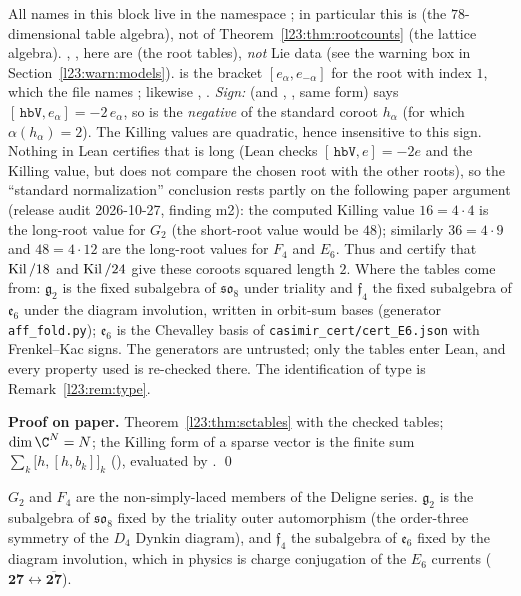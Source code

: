 \begin{dictionary}
All names in this block live in the namespace ; in particular this  is
 (the $78$-dimensional table algebra), not  of Theorem~\ref{l23:thm:rootcounts}
(the lattice algebra). , ,  here are  (the root tables), \emph{not} Lie data (see the
warning box in Section~\ref{l23:warn:models}).  is the bracket $[e_\alpha,e_{-\alpha}]$ for the root with index $1$, which
the file names ; likewise , . \emph{Sign:}  (and , ,
same form) says $[\,\mathtt{hbV},e_\alpha]=-2\,e_\alpha$, so  is the \emph{negative} of the standard coroot $h_\alpha$ (for which
$\alpha(h_\alpha)=2$). The Killing values are quadratic, hence insensitive to this sign. Nothing in Lean certifies that  is long
(Lean checks $[\,\mathtt{hbV},e]=-2e$ and the Killing value, but does not compare the chosen root with the other roots), so the
``standard normalization'' conclusion rests partly on the following paper argument (release audit 2026-10-27, finding m2): the computed Killing value $16=4\cdot4$ is the long-root value for $G_2$ (the short-root value would be $48$); similarly $36=4\cdot9$
and $48=4\cdot12$ are the long-root values for $F_4$ and $E_6$. Thus  and  certify that
$\operatorname{Kil}/18$ and $\operatorname{Kil}/24$ give these coroots squared length $2$. Where the
tables come from: $\mathfrak g_2$ is the fixed subalgebra of $\mathfrak{so}_8$ under triality and $\mathfrak f_4$ the fixed subalgebra of $\mathfrak e_6$
under the diagram involution, written in orbit-sum bases (generator \texttt{aff\_fold.py}); $\mathfrak e_6$ is the Chevalley basis of
\texttt{casimir\_cert/cert\_E6.json} with Frenkel--Kac signs. The generators are untrusted; only the tables enter Lean, and every property used
is re-checked there. The identification of type is Remark~\ref{l23:rem:type}.
\end{dictionary}

\textbf{Proof on paper.} Theorem~\ref{l23:thm:sctables} with the checked tables; $\dim\C^N=N$; the Killing form of a sparse vector is the
finite sum $\sum_k\big[h,[h,b_k]\big]_k$ (), evaluated by . \qed

\begin{physics}
$G_2$ and $F_4$ are the non-simply-laced members of the Deligne series. $\mathfrak g_2$ is the subalgebra of $\mathfrak{so}_8$ fixed by
the triality outer automorphism (the order-three symmetry of the $D_4$ Dynkin diagram), and $\mathfrak f_4$ the subalgebra of $\mathfrak e_6$
fixed by the diagram involution, which in physics is charge conjugation of the $E_6$ currents ($\mathbf{27}\leftrightarrow\overline{\mathbf{27}}$).
\end{physics}

